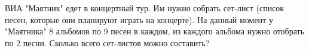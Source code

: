 \question
ВИА "Маятник" едет в концертный тур. Им нужно собрать сет-лист (список песен, которые они планируют играть на концерте). На данный момент у "Маятника" 8 альбомов по 9 песен в каждом, из каждого альбома нужно отобрать по 2 песни. Сколько всего сет-листов можно составить?
